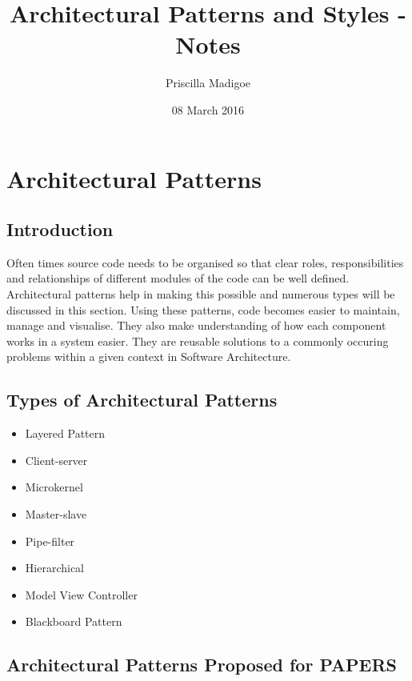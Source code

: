 \documentclass[a4paper,12pt]{article}
\begin{document}
\title{Architectural Patterns and Styles - Notes}
\author{Priscilla Madigoe}
\date{08 March 2016}
\maketitle
 
\section{Architectural Patterns}

\subsection{Introduction}
Often times source code needs to be organised so that clear roles, responsibilities and relationships of different modules of the code can be well defined. Architectural patterns help in making this possible and numerous types will be discussed in this section. Using these patterns, code becomes easier to maintain, manage and visualise. They also make understanding of how each component works in a system easier. They are reusable solutions to a commonly occuring problems within a given context in Software Architecture.

\subsection{Types of Architectural Patterns}

\begin{itemize}
\item Layered Pattern
\item Client-server
\item Microkernel
\item Master-slave
\item Pipe-filter
\item Hierarchical
\item Model View Controller
\item Blackboard Pattern
\end{itemize}

\subsection{Architectural Patterns Proposed for PAPERS}
\end{document}
